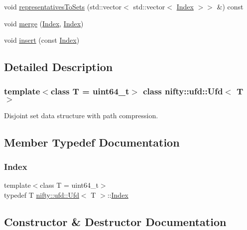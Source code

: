 \begin{DoxyCompactItemize}
\item 
void \hyperlink{classnifty_1_1ufd_1_1Ufd_a775039106582ee5f0a13c3fbd9099aa8}{representatives\+To\+Sets} (std\+::vector$<$ std\+::vector$<$ \hyperlink{classnifty_1_1ufd_1_1Ufd_a0a9a7ab02b6d77fb2035234cbda8b3a7}{Index} $>$$>$ \&) const
\item 
void \hyperlink{classnifty_1_1ufd_1_1Ufd_aeb49fa316c1956ce636e68e96e003d2f}{merge} (\hyperlink{classnifty_1_1ufd_1_1Ufd_a0a9a7ab02b6d77fb2035234cbda8b3a7}{Index}, \hyperlink{classnifty_1_1ufd_1_1Ufd_a0a9a7ab02b6d77fb2035234cbda8b3a7}{Index})
\item 
void \hyperlink{classnifty_1_1ufd_1_1Ufd_a89f525ed27ef959ff30666daa13741fe}{insert} (const \hyperlink{classnifty_1_1ufd_1_1Ufd_a0a9a7ab02b6d77fb2035234cbda8b3a7}{Index})
\end{DoxyCompactItemize}


\subsection{Detailed Description}
\subsubsection*{template$<$class T = uint64\+\_\+t$>$\newline
class nifty\+::ufd\+::\+Ufd$<$ T $>$}

Disjoint set data structure with path compression. 

\subsection{Member Typedef Documentation}
\mbox{\label{classnifty_1_1ufd_1_1Ufd_a0a9a7ab02b6d77fb2035234cbda8b3a7}} 
\subsubsection{\texorpdfstring{Index}{Index}}
{\footnotesize\ttfamily template$<$class T = uint64\+\_\+t$>$ \\
typedef T \hyperlink{classnifty_1_1ufd_1_1Ufd}{nifty\+::ufd\+::\+Ufd}$<$ T $>$\+::\hyperlink{classnifty_1_1ufd_1_1Ufd_a0a9a7ab02b6d77fb2035234cbda8b3a7}{Index}}



\subsection{Constructor \& Destructor Documentation}
\mbox{\label{classnifty_1_1ufd_1_1Ufd_aab82fff1e159408a465bee8547f67358}} 
